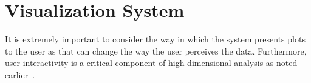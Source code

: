 
\chapter{Visualization System \label{ch:visualizer}}

It is extremely important to consider the way in which the system presents plots to the user as that can change the way the user perceives the data. Furthermore, user interactivity is a critical component of high dimensional analysis as noted earlier~\cite{lius2016}.





